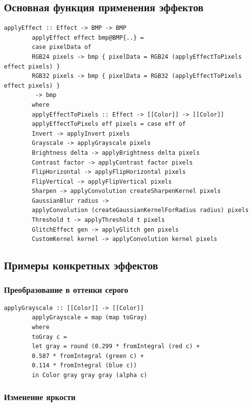 \documentclass[a4paper,12pt]{article}
\begin{document}
	\subsection{Основная функция применения эффектов}
	
	\begin{lstlisting}[caption=Функция применения эффектов, label=lst:apply-effect]
		applyEffect :: Effect -> BMP -> BMP
		applyEffect effect bmp@BMP{..} =
		case pixelData of
		RGB24 pixels -> bmp { pixelData = RGB24 (applyEffectToPixels effect pixels) }
		RGB32 pixels -> bmp { pixelData = RGB32 (applyEffectToPixels effect pixels) }
		 -> bmp  
		where
		applyEffectToPixels :: Effect -> [[Color]] -> [[Color]]
		applyEffectToPixels eff pixels = case eff of
		Invert -> applyInvert pixels
		Grayscale -> applyGrayscale pixels
		Brightness delta -> applyBrightness delta pixels
		Contrast factor -> applyContrast factor pixels
		FlipHorizontal -> applyFlipHorizontal pixels
		FlipVertical -> applyFlipVertical pixels
		Sharpen -> applyConvolution createSharpenKernel pixels
		GaussianBlur radius -> 
		applyConvolution (createGaussianKernelForRadius radius) pixels
		Threshold t -> applyThreshold t pixels
		GlitchEffect gen -> applyGlitch gen pixels
		CustomKernel kernel -> applyConvolution kernel pixels
	\end{lstlisting}
	
	\subsection{Примеры конкретных эффектов}
	
	\subsubsection{Преобразование в оттенки серого}
	
	\begin{lstlisting}[caption=Алгоритм оттенков серого, label=lst:grayscale]
		applyGrayscale :: [[Color]] -> [[Color]]
		applyGrayscale = map (map toGray)
		where
		toGray c =
		let gray = round (0.299 * fromIntegral (red c) +
		0.587 * fromIntegral (green c) +
		0.114 * fromIntegral (blue c))
		in Color gray gray gray (alpha c)
	\end{lstlisting}
	
	\subsubsection{Изменение яркости}
	
\end{document}

